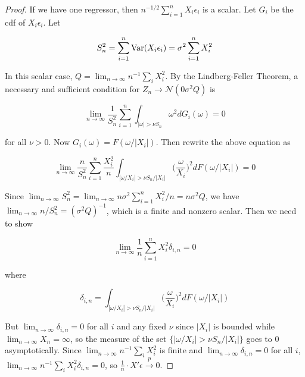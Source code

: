 \begin{proof} If we have one regressor, then \(n^{-1/2}\sum_{i=1}^nX_i\epsilon_i\) is a scalar. Let \(G_i\) be the cdf of \(X_i \epsilon_i\). Let 

\[
S_n^2 = \sum_{i=1}^n \Var(X_i \epsilon_i) = \sigma^2 \sum_{i=1}^n X_i^2
\]

In this scalar case, \(Q = \lim_{n \to \infty} n^{-1} \sum_i X_i^2\). By the Lindberg-Feller Theorem, a necessary and sufficient condition for \(Z_n \to \mathcal{N}(0 \sigma^2 Q)\) is

\[
\lim_{n \to \infty} \frac{1}{S_n^2} \sum_{i=1}^n \int_{|\omega| > \nu S_n} \omega^2 dG_i(\omega) = 0
\]

for all \(\nu > 0\). Now \(G_i(\omega) = F( \omega/|X_i|)\). Then rewrite the above equation as 

\[
\lim_{n \to \infty} \frac{n}{S_n^2} \sum_{i=1}^n \frac{X_i^2}{n} \int_{|\omega/X_i| > \nu S_n/|X_i|} \bigg( \frac{\omega}{X_i} \bigg)^2 dF(\omega/|X_i|) = 0
\]

Since \(\lim_{n \to \infty}S_n^2 = \lim_{n \to \infty} n \sigma^2 \sum_{i=1}^n X_i^2/n = n \sigma^2 Q\), we have \(\lim_{n \to \infty} n/S_n^2 = (\sigma^2Q)^{-1}\), which is a finite and nonzero scalar. Then we need to show

\[
\lim_{n \to \infty} \frac{1}{n} \sum_{i=1}^n X_i^2 \delta_{i,n} = 0
\]

where 

\[
\delta_{i,n} = \int_{|\omega/X_i| > \nu S_n/|X_i|} \bigg( \frac{\omega}{X_i} \bigg)^2 dF(\omega/|X_i|)
\]

But \(\lim_{n \to \infty} \delta_{i,n} = 0\) for all \(i\) and any fixed \(\nu\) since \(|X_i|\) is bounded while \(\lim_{n \to \infty}X_n = \infty\), so the measure of the set \(\{|\omega/X_i| > \nu S_n/|X_i|\}\) goes to 0 asymptotically. Since \(\lim_{n \to \infty} n^{-1}\sum_i X_i^2\) is finite and \(\lim_{n \to \infty} \delta_{i,n} = 0\) for all \(i\), \(\lim_{n \to \infty} n^{-1} \sum_i X_i^2 \delta_{i,n} = 0\), so \(\frac{1}{n} \cdot X' \epsilon \xrightarrow{p} 0\).

\end{proof}

